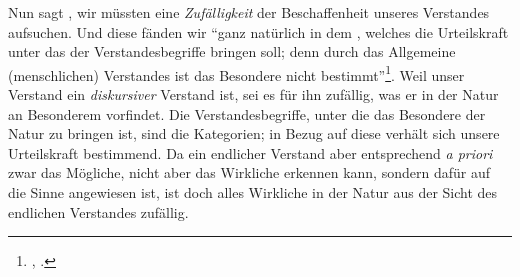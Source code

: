 Nun sagt , wir müssten eine \emph{Zufälligkeit} der
Beschaffenheit unseres Verstandes aufsuchen. Und diese
fänden wir \enquote{ganz natürlich in dem , welches die
Urteilskraft unter das  der Verstandesbegriffe bringen soll; denn durch das Allgemeine
 (menschlichen) Verstandes ist das Besondere nicht
bestimmt}\footnote{\cite[][\S~77]{Kant:KritikderUrteilskraft2009},
\cite[][V: 406.11--14]{Kant:GesammelteWerke1900ff.}.}. Weil unser Verstand ein
\emph{diskursiver} Verstand ist, sei es für ihn
zufällig, was er in der Natur an Besonderem vorfindet. Die Verstandesbegriffe,
unter die das Besondere der Natur zu bringen ist, sind die Kategorien; in Bezug
auf diese verhält sich unsere Urteilskraft bestimmend. Da ein endlicher Verstand
aber entsprechend \emph{a priori} zwar das Mögliche, nicht aber das Wirkliche
erkennen kann, sondern dafür auf die Sinne angewiesen ist, ist doch alles
Wirkliche in der Natur aus der Sicht des endlichen Verstandes
zufällig.

